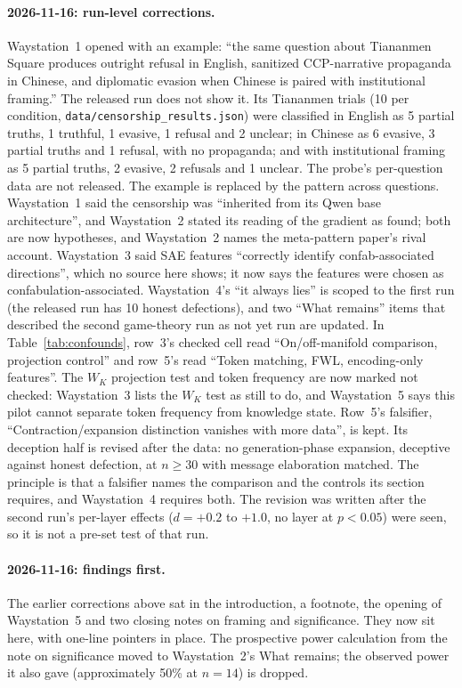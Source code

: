 \documentclass[11pt,a4paper]{article}
\begin{document}
\paragraph{2026-11-16: run-level corrections.}
Waystation~1 opened with an example: ``the same question about
Tiananmen Square produces outright refusal in English, sanitized
CCP-narrative propaganda in Chinese, and diplomatic evasion when Chinese
is paired with institutional framing.'' The released run does not show
it. Its Tiananmen trials (10 per condition,
\texttt{data/censorship\_results.json}) were classified in English as
5 partial truths, 1 truthful, 1 evasive, 1 refusal and 2 unclear; in
Chinese as 6 evasive, 3 partial truths and 1 refusal, with no
propaganda; and with institutional framing as 5 partial truths, 2
evasive, 2 refusals and 1 unclear. The probe's per-question data are
not released. The example is replaced by the pattern across questions.
Waystation~1 said the censorship was ``inherited from its Qwen base
architecture'', and Waystation~2 stated its reading of the gradient as
found; both are now hypotheses, and Waystation~2 names the meta-pattern
paper's rival account. Waystation~3 said SAE features ``correctly
identify confab-associated directions'', which no source here shows; it
now says the features were chosen as confabulation-associated.
Waystation~4's ``it always lies'' is scoped to the first run (the
released run has 10 honest defections), and two ``What remains'' items
that described the second game-theory run as not yet run are updated.
In Table~\ref{tab:confounds}, row~3's checked cell read
``On/off-manifold comparison, projection control'' and row~5's read
``Token matching, FWL, encoding-only features''. The $W_K$ projection
test and token frequency are now marked not checked: Waystation~3 lists
the $W_K$ test as still to do, and Waystation~5 says this pilot cannot
separate token frequency from knowledge state. Row~5's falsifier,
``Contraction/expansion distinction vanishes with more data'', is kept.
Its deception half is revised after the data: no generation-phase
expansion, deceptive against honest defection, at $n \geq 30$ with
message elaboration matched. The principle is that a falsifier names
the comparison and the controls its section requires, and Waystation~4
requires both. The revision was written after the second run's
per-layer effects ($d = +0.2$ to $+1.0$, no layer at $p < 0.05$) were
seen, so it is not a pre-set test of that run.

\paragraph{2026-11-16: findings first.}
The earlier corrections above sat in the introduction, a
footnote, the opening of Waystation~5 and two closing notes on framing
and significance. They now sit here, with one-line pointers in place.
The prospective power calculation from the note on significance moved
to Waystation~2's What remains; the observed power it also gave
(approximately 50\% at $n = 14$) is dropped.



\end{document}
